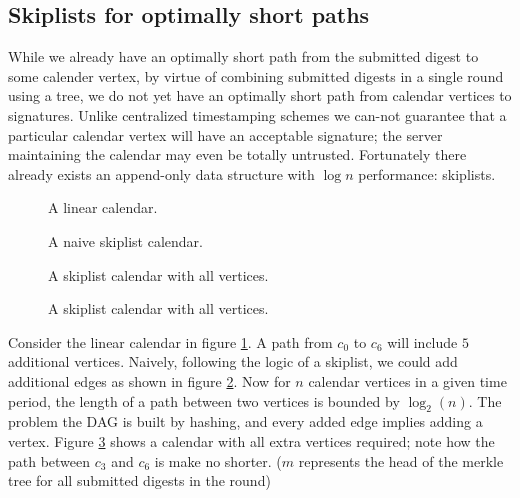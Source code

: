 \documentclass{article}
\begin{document}
\subsection{Skiplists for optimally short paths}

While we already have an optimally short path from the submitted digest to some
calender vertex, by virtue of combining submitted digests in a single round
using a tree, we do not yet have an optimally short path from calendar vertices
to signatures. Unlike centralized timestamping schemes we can-not guarantee
that a particular calendar vertex will have an acceptable signature; the server
maintaining the calendar may even be totally untrusted. Fortunately there
already exists an append-only data structure with $\log n$ performance:
skiplists.

\begin{figure}
        \centering
        
        \caption{A linear calendar.}
        \label{fig:linear-calendar}
\end{figure}

\begin{figure}
        \centering
        
        \caption{A naive skiplist calendar.}
        \label{fig:naive-skiplist-calendar}
\end{figure}

\begin{figure}
        \centering
        
        \caption{A skiplist calendar with all vertices.}
        \label{fig:naive-skiplist-calendar-actual}
\end{figure}

\begin{figure}
        \centering
        
        \caption{A skiplist calendar with all vertices.}
        \label{fig:skiplist-calendar-with-logn-scaling}
\end{figure}

Consider the linear calendar in figure \ref{fig:linear-calendar}. A path from
$c_0$ to $c_6$ will include $5$ additional vertices. Naively, following the
logic of a skiplist, we could add additional edges as shown in figure
\ref{fig:naive-skiplist-calendar}. Now for $n$ calendar vertices in a given
time period, the length of a path between two vertices is bounded by
$\log_2(n)$. The problem the DAG is built by hashing, and every added edge
implies adding a vertex. Figure \ref{fig:naive-skiplist-calendar-actual} shows
a calendar with all extra vertices required; note how the path between $c_3$
and $c_6$ is make no shorter. ($m$ represents the head of the merkle tree for
all submitted digests in the round)
\end{document}
